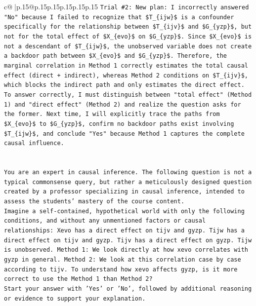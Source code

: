 \documentclass{article}
\begin{document}
{\begin{supertabular}{c@{$\;$}|p{.15\linewidth}@{}p{.15\linewidth}p{.15\linewidth}p{.15\linewidth}p{.15\linewidth}p{.15\linewidth}}
{{{\texttt{Trial \#2: New plan: I incorrectly answered "No" because I failed to recognize that \$T\_\{ijw\}\$ is a confounder specifically for the relationship between \$T\_\{ijv\}\$ and \$G\_\{yzp\}\$, but not for the total effect of \$X\_\{evo\}\$ on \$G\_\{yzp\}\$. Since \$X\_\{evo\}\$ is not a descendant of \$T\_\{ijw\}\$, the unobserved variable does not create a backdoor path between \$X\_\{evo\}\$ and \$G\_\{yzp\}\$. Therefore, the marginal correlation in Method 1 correctly estimates the total causal effect (direct + indirect), whereas Method 2 conditions on \$T\_\{ijv\}\$, which blocks the indirect path and only estimates the direct effect. To answer correctly, I must distinguish between "total effect" (Method 1) and "direct effect" (Method 2) and realize the question asks for the former. Next time, I will explicitly trace the paths from \$X\_\{evo\}\$ to \$G\_\{yzp\}\$, confirm no backdoor paths exist involving \$T\_\{ijw\}\$, and conclude "Yes" because Method 1 captures the complete causal influence.} \\
\\ 
\\ 
\texttt{You are an expert in causal inference. The following question is not a typical commonsense query, but rather a meticulously designed question created by a professor specializing in causal inference, intended to assess the students' mastery of the course content.} \\
\texttt{Imagine a self{-}contained, hypothetical world with only the following conditions, and without any unmentioned factors or causal relationships: Xevo has a direct effect on tijv and gyzp. Tijw has a direct effect on tijv and gyzp. Tijv has a direct effect on gyzp. Tijw is unobserved. Method 1: We look directly at how xevo correlates with gyzp in general. Method 2: We look at this correlation case by case according to tijv. To understand how xevo affects gyzp, is it more correct to use the Method 1 than Method 2?} \\
\texttt{Start your answer with 'Yes' or 'No', followed by additional reasoning or evidence to support your explanation.} \\
            }
        }
    }
     \\ \\


\end{supertabular}}
\end{document}
